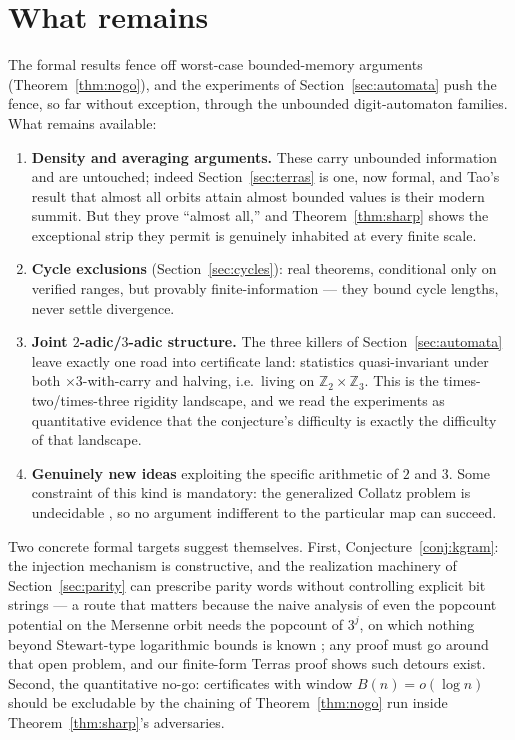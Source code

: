 \documentclass[11pt]{article}
\newcommand{\Z}{\mathbb{Z}}
\newcommand{\Ztwo}{\Z_2}
\begin{document}
\section{What remains}\label{sec:discussion}

The formal results fence off worst-case bounded-memory arguments
(Theorem~\ref{thm:nogo}), and the experiments of
Section~\ref{sec:automata} push the fence, so far without exception,
through the unbounded digit-automaton families. What remains
available:

\begin{enumerate}
\item \textbf{Density and averaging arguments.} These carry unbounded
information and are untouched; indeed Section~\ref{sec:terras} is one,
now formal, and Tao's result that almost all orbits attain almost
bounded values \cite{tao} is their modern summit. But they prove
``almost all,'' and Theorem~\ref{thm:sharp} shows the exceptional
strip they permit is genuinely inhabited at every finite scale.
\item \textbf{Cycle exclusions} (Section~\ref{sec:cycles}): real
theorems, conditional only on verified ranges, but provably
finite-information --- they bound cycle lengths, never settle
divergence.
\item \textbf{Joint $2$-adic/$3$-adic structure.} The three killers of
Section~\ref{sec:automata} leave exactly one road into certificate
land: statistics quasi-invariant under both $\times 3$-with-carry and
halving, i.e.\ living on $\Ztwo \times \Z_3$. This is the
times-two/times-three rigidity landscape, and we read the experiments
as quantitative evidence that the conjecture's difficulty is exactly
the difficulty of that landscape.
\item \textbf{Genuinely new ideas} exploiting the specific arithmetic
of $2$ and $3$. Some constraint of this kind is mandatory: the
generalized Collatz problem is undecidable \cite{conway, kurtz-simon},
so no argument indifferent to the particular map can succeed.
\end{enumerate}

Two concrete formal targets suggest themselves. First,
Conjecture~\ref{conj:kgram}: the injection mechanism is constructive,
and the realization machinery of Section~\ref{sec:parity} can
prescribe parity words without controlling explicit bit strings --- a
route that matters because the naive analysis of even the popcount
potential on the Mersenne orbit needs the popcount of $3^j$, on which
nothing beyond Stewart-type logarithmic bounds is known
\cite{stewart}; any proof must go around that open problem, and our
finite-form Terras proof shows such detours exist. Second, the
quantitative no-go: certificates with window $B(n) = o(\log n)$ should
be excludable by the chaining of Theorem~\ref{thm:nogo} run inside
Theorem~\ref{thm:sharp}'s adversaries.
\end{document}
